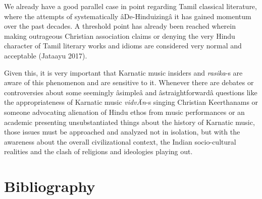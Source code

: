 We already have a good parallel case in point regarding Tamil classical literature, where the attempts of systematically âDe-Hinduizingâ it has gained momentum over the past decades. A threshold point has already been reached wherein making outrageous Christian association claims or denying the very Hindu character of Tamil literary works and idioms are considered very normal and acceptable (Jataayu 2017).

Given this, it is very important that Karnatic music insiders and \textit{rasika}-s are aware of this phenomenon and are sensitive to it. Whenever there are debates or controversies about some seemingly âsimpleâ and âstraightforwardâ questions like the appropriateness of Karnatic music \textit{vidvÄn}-s singing Christian Keerthanams or someone advocating alienation of Hindu ethos from music performances or an academic presenting unsubstantiated things about the history of Karnatic music, those issues must be approached and analyzed not in isolation, but with the awareness about the overall civilizational context, the Indian socio-cultural realities and the clash of religions and ideologies playing out.


\section*{Bibliography}

